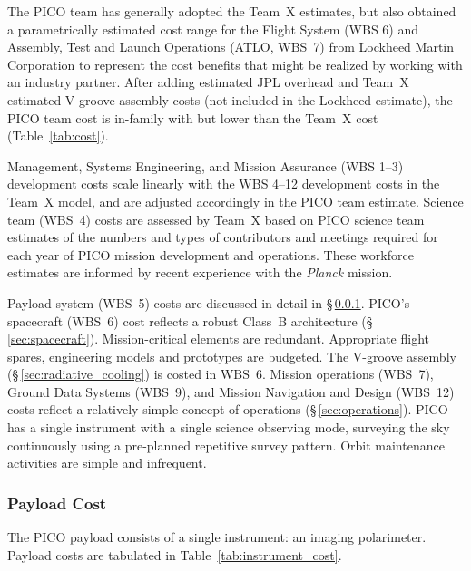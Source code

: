 The PICO team has generally adopted the Team~X estimates, but also
obtained a parametrically estimated cost range for the Flight System
(WBS 6) and Assembly, Test and Launch Operations (ATLO, WBS~7) from
Lockheed Martin Corporation to represent the cost benefits that might
be realized by working with an industry partner. After adding
estimated JPL overhead and Team~X estimated V-groove assembly costs
(not included in the Lockheed estimate), the PICO team cost is
in-family with but lower than the Team~X cost (Table~\ref{tab:cost}).

Management, Systems Engineering, and Mission Assurance (WBS 1--3)
development costs scale linearly with the WBS 4--12 development costs
in the Team~X model, and are adjusted accordingly in the PICO team
estimate. Science team (WBS~4) costs are assessed by Team~X based on PICO
science team estimates of the numbers and types of contributors and
meetings required for each year of PICO mission development and
operations. These workforce estimates are informed by recent
experience with the \textit{Planck} mission.

Payload system (WBS~5) costs are discussed in detail in
\S\,\ref{sec:instrument_cost}.  PICO's spacecraft (WBS~6) cost
reflects a robust Class~B architecture
(\S\,\ref{sec:spacecraft}). Mission-critical elements are
redundant. Appropriate flight spares, engineering models and
prototypes are budgeted. The V-groove assembly (\S\,\ref{sec:radiative_cooling})
is costed in WBS~6.  Mission operations (WBS~7), Ground Data Systems
(WBS~9), and Mission Navigation and Design (WBS~12) costs reflect a
relatively simple concept of operations (\S\,\ref{sec:operations}). PICO has a single
instrument with a single science observing mode, surveying the sky
continuously using a pre-planned repetitive survey pattern. Orbit
maintenance activities are simple and infrequent.

\subsubsection{Payload Cost}
\label{sec:instrument_cost} %

The PICO payload consists of a single instrument: an imaging
polarimeter. Payload costs are tabulated in
Table~\ref{tab:instrument_cost}.


